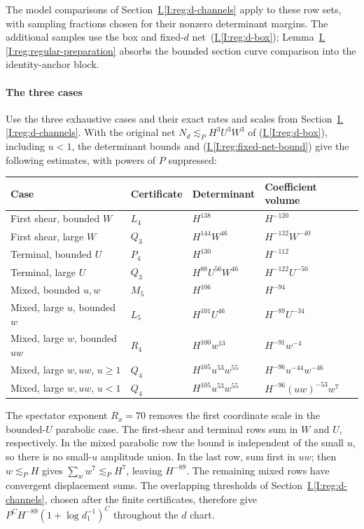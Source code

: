 \documentclass[11pt]{amsart}
\theoremstyle{definition}
\theoremstyle{remark}
\numberwithin{equation}{section}
\newcommand{\partIref}[1]{\hyperref[I:#1]{I.\ref*{I:#1}}}
\newcommand{\partIeqref}[1]{\textup{(\partIref{#1})}}
\begin{document}
The model comparisons of Section~\partIref{reg:d-channels} apply to these row sets, with sampling fractions chosen for their nonzero determinant margins. The additional samples use the box and fixed-$d$ net~\partIeqref{reg:d-box}; Lemma~\partIref{reg:regular-preparation} absorbs the bounded section curve comparison into the identity-anchor block.

\paragraph{The three cases}

Use the three exhaustive cases and their exact rates and scales from Section~\partIref{reg:d-channels}. With the original net $N_d\lesssim_PH^3U^3W^3$ of \partIeqref{reg:d-box}, including $u<1$, the determinant bounds and \partIeqref{reg:fixed-net-bound} give the following estimates, with powers of $P$ suppressed:
\begin{center}\small
\begin{tabular}{llll}
\toprule
Case & Certificate & Determinant & Coefficient volume\\
\midrule
First shear, bounded $W$ & $L_4$ & $H^{138}$ & $H^{-120}$\\
First shear, large $W$ & $Q_3$ & $H^{144}W^{46}$ & $H^{-132}W^{-40}$\\
Terminal, bounded $U$ & $P_4$ & $H^{130}$ & $H^{-112}$\\
Terminal, large $U$ & $Q_3$ & $H^{88}U^{56}W^{46}$ & $H^{-122}U^{-50}$\\
Mixed, bounded $u,w$ & $M_5$ & $H^{106}$ & $H^{-94}$\\
Mixed, large $u$, bounded $w$ & $L_5$ & $H^{101}U^{46}$ & $H^{-89}U^{-34}$\\
Mixed, large $w$, bounded $uw$ & $R_4$ & $H^{100}w^{13}$ & $H^{-91}w^{-4}$\\
Mixed, large $w,uw$, $u\ge1$ & $Q_4$ & $H^{105}u^{53}w^{55}$ & $H^{-96}u^{-44}w^{-46}$\\
Mixed, large $w,uw$, $u<1$ & $Q_4$ & $H^{105}u^{53}w^{55}$ & $H^{-96}(uw)^{-53}w^7$\\
\bottomrule
\end{tabular}
\end{center}

The spectator exponent $R_x=70$ removes the first coordinate scale in the bounded-$U$ parabolic case. The first-shear and terminal rows sum in $W$ and $U$, respectively. In the mixed parabolic row the bound is independent of the small $u$, so there is no small-$u$ amplitude union. In the last row, sum first in $uw$; then $w\lesssim_PH$ gives $\sum_w w^7\lesssim_PH^7$, leaving $H^{-89}$. The remaining mixed rows have convergent displacement sums. The overlapping thresholds of Section~\partIref{reg:d-channels}, chosen after the finite certificates, therefore give $P^CH^{-89}(1+\log d_1^{-1})^C$ throughout the $d$ chart.
\end{document}
